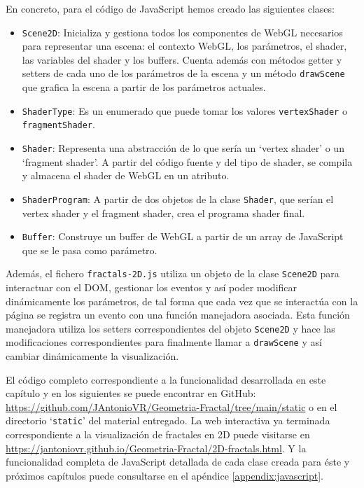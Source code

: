 En concreto, para el código de JavaScript hemos creado las siguientes clases:
\begin{itemize}
    \item \verb|Scene2D|: Inicializa y gestiona todos los componentes de WebGL necesarios para representar una escena: el contexto WebGL, los parámetros, el shader, las variables del shader y los buffers. Cuenta además con métodos getter y setters de cada uno de los parámetros de la escena y un método \verb|drawScene| que grafica la escena a partir de los parámetros actuales.
    \item \texttt{ShaderType}: Es un enumerado que puede tomar los valores \texttt{vertexShader} o \texttt{fragmentShader}.
    \item \verb|Shader|: Representa una abstracción de lo que sería un `vertex shader' o un `fragment shader'. A partir del código fuente y del tipo de shader, se compila y almacena el shader de WebGL en un atributo.
    \item \verb|ShaderProgram|: A partir de dos objetos de la clase \verb|Shader|, que serían el vertex shader y el fragment shader, crea el programa shader final.
    \item \verb|Buffer|: Construye un buffer de WebGL a partir de un array de JavaScript que se le pasa como parámetro.
\end{itemize}

Además, el fichero \verb|fractals-2D.js| utiliza un objeto de la clase \verb|Scene2D| para interactuar con el DOM, gestionar los eventos y así poder modificar dinámicamente los parámetros, de tal forma que cada vez que se interactúa con la página se registra un evento con una función manejadora asociada. Esta función manejadora utiliza los setters correspondientes del objeto \verb|Scene2D| y hace las modificaciones correspondientes para finalmente llamar a \verb|drawScene| y así cambiar dinámicamente la visualización.

El código completo correspondiente a la funcionalidad desarrollada en este capítulo y en los siguientes se puede encontrar en GitHub: \url{https://github.com/JAntonioVR/Geometria-Fractal/tree/main/static} o en el directorio `\verb|static|' del material entregado. La web interactiva ya terminada correspondiente a la visualización de fractales en 2D puede visitarse en \url{https://jantoniovr.github.io/Geometria-Fractal/2D-fractals.html}. Y la funcionalidad completa de JavaScript detallada de cada clase creada para éste y próximos capítulos puede consultarse en el apéndice \ref{appendix:javascript}.

